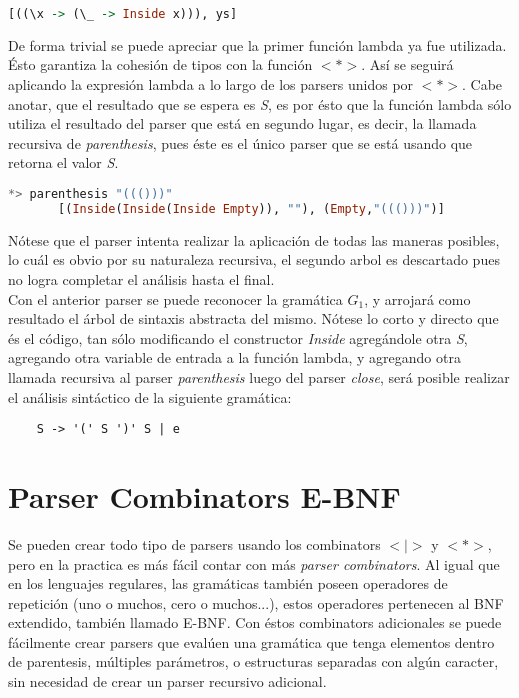 \begin{exmp}
	\begin{lstlisting}[language=Haskell]
	[((\x -> (\_ -> Inside x))), ys]
	\end{lstlisting}
	
	De forma trivial se puede apreciar que la primer función lambda ya fue utilizada. Ésto garantiza la cohesión de tipos  con la función $<*>$. Así se seguirá aplicando la expresión lambda a lo largo de los parsers unidos por $<*>$. Cabe anotar, que el resultado que se espera es \emph{S}, es por ésto que la función lambda sólo utiliza el resultado del parser que está en segundo lugar, es decir, la llamada recursiva de \emph{parenthesis}, pues éste es el único parser que se está usando que retorna el valor \emph{S}. 
	
	\begin{lstlisting}[language=Haskell]
	*> parenthesis "((()))"
	   [(Inside(Inside(Inside Empty)), ""), (Empty,"((()))")]
	\end{lstlisting}
	
	Nótese que el parser intenta realizar la aplicación de todas las maneras posibles, lo cuál es obvio por su naturaleza recursiva, el segundo arbol es descartado pues no logra completar el análisis hasta el final.\\
	
	Con el anterior parser se puede reconocer la gramática $G_1$, y arrojará como resultado el árbol de sintaxis abstracta del mismo. Nótese lo corto y directo que és el código, tan sólo modificando el constructor \emph{Inside} agregándole otra \emph{S}, agregando otra variable de entrada a la función lambda, y agregando otra llamada recursiva al parser \emph{parenthesis} luego del parser \emph{close}, será posible realizar el análisis sintáctico de la siguiente gramática:
	
	\begin{lstlisting}
	S -> '(' S ')' S | e
	\end{lstlisting}
	
\end{exmp}

\section{Parser Combinators E-BNF}
Se pueden crear todo tipo de parsers usando los combinators $<|>$ y $<*>$, pero en la practica es más fácil contar con más \emph{parser combinators}. Al igual que en los lenguajes regulares, las gramáticas también poseen operadores de repetición (uno o muchos, cero o muchos...), estos operadores pertenecen al BNF extendido, también llamado E-BNF. Con éstos combinators adicionales se puede fácilmente crear parsers que evalúen una gramática que tenga elementos dentro de parentesis, múltiples parámetros, o estructuras separadas con algún caracter, sin necesidad de crear un parser recursivo adicional.

